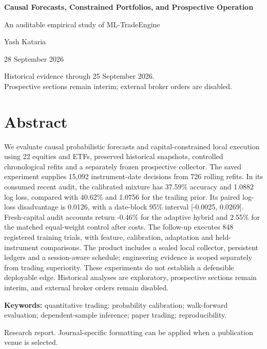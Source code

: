 \documentclass[11pt,a4paper]{article}
\begin{document}
\begin{titlepage}
\centering
\vspace*{8mm}
{\LARGE\bfseries Causal Forecasts, Constrained Portfolios, and Prospective Operation\par}
\vspace{5mm}
{\large An auditable empirical study of ML-TradeEngine\par}
\vspace{8mm}
{\Large Yash Kataria\par}
\vspace{6mm}
{28 September 2026\par}
\vspace{6mm}
{\small Historical evidence through 25 September 2026.\\Prospective sections remain interim; external broker orders are disabled.\par}
\vspace{10mm}
\begin{minipage}{.94\textwidth}
\section*{Abstract}
We evaluate causal probabilistic forecasts and capital-constrained local execution using 22 equities and ETFs, preserved historical snapshots, controlled chronological refits and a separately frozen prospective collector. The saved experiment supplies 15,092 instrument-date decisions from 726 rolling refits. In its consumed recent audit, the calibrated mixture has 37.59\% accuracy and 1.0882 log loss, compared with 40.62\% and 1.0756 for the trailing prior. Its paired log-loss disadvantage is 0.0126, with a date-block 95\% interval [-0.0025, 0.0269]. Fresh-capital audit accounts return -0.46\% for the adaptive hybrid and 2.55\% for the matched equal-weight control after costs. The follow-up executes 848 registered training trials, with feature, calibration, adaptation and held-instrument comparisons. The product includes a sealed local collector, persistent ledgers and a session-aware schedule; engineering evidence is scoped separately from trading superiority. These experiments do not establish a defensible deployable edge. Historical analyses are exploratory, prospective sections remain interim, and external broker orders remain disabled.


\par\medskip
\noindent\textbf{Keywords:} quantitative trading; probability calibration; walk-forward evaluation; dependent-sample inference; paper trading; reproducibility.
\end{minipage}
\vfill
{\small Research report. Journal-specific formatting can be applied when a publication venue is selected.\par}
\end{titlepage}
\setcounter{page}{2}
\tableofcontents
\clearpage
{}
\end{document}
